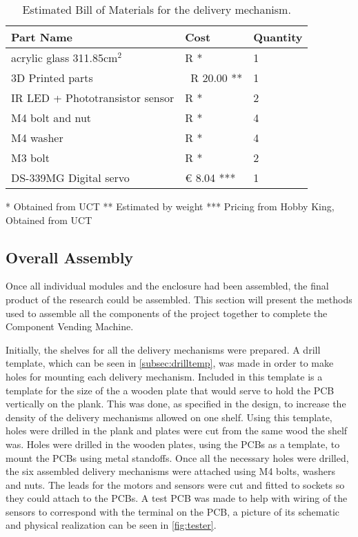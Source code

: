 \documentclass[a4paper,11pt]{article}
\numberwithin{figure}{section}
\numberwithin{table}{section}
\begin{document}
	\begin{table}[ht]
	\centering		
	\begin{tabular}{| m{8cm} | m{4cm}| m{3cm} |}
	\hline
	\textbf{Part Name} & \textbf{Cost} & \textbf{Quantity} \\
	\hline
	acrylic glass 311.85cm$^2$ & R * & 1 \\
	\hline
	3D Printed parts & ~R 20.00 ** & 1 \\
	\hline
	IR LED + Phototransistor sensor & R * & 2 \\
	\hline
	M4 bolt and nut & R * & 4 \\
	\hline 
	M4 washer & R * & 4 \\
	\hline	
	M3 bolt & R * & 2 \\
	\hline
	DS-339MG Digital servo & \euro{} 8.04 *** & 1 \\
	\hline
	\end{tabular}
	
	 * Obtained from UCT
	 ** Estimated by weight
	 *** Pricing from Hobby King, Obtained from UCT
	\caption{Estimated Bill of Materials for the delivery mechanism. \label{tab:bomdel}}
	\end{table}	

\subsection{Overall Assembly}
\label{subsec:finbuild}
Once all individual modules and the enclosure had been assembled, the final product of the research could be assembled. This section will present the methods used to assemble all the components of the project together to complete the Component Vending Machine.

Initially, the shelves for all the delivery mechanisms were prepared. A drill template, which can be seen in \autoref{subsec:drilltemp}, was made in order to make holes for mounting each delivery mechanism. Included in this template is a template for the size of the a wooden plate that would serve to hold the PCB vertically on the plank. This was done, as specified in the design, to increase the density of the delivery mechanisms allowed on one shelf. Using this template, holes were drilled in the plank and plates were cut from the same wood the shelf was. Holes were drilled in the wooden plates, using the PCBs as a template, to mount the PCBs using metal standoffs. Once all the necessary holes were drilled, the six assembled delivery mechanisms were attached using M4 bolts, washers and nuts. The leads for the motors and sensors were cut and fitted to sockets so they could attach to the PCBs. A test PCB was made to help with wiring of the sensors to correspond with the terminal on the PCB, a picture of its schematic and physical realization can be seen in \autoref{fig:tester}.
\end{document}
